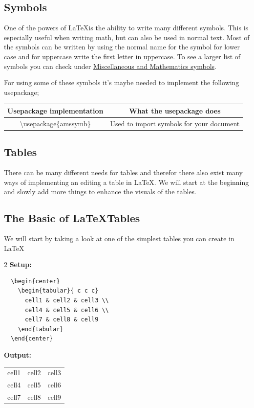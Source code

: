 \documentclass{article}
\newcommand{\bs}[1]{\textbackslash{}#1} %
\begin{document}
\subsection{Symbols}
One of the powers of \LaTeX is the ability to write many different symbols. This is especially useful when writing math, but can also be used in normal text. Most of the symbols can be written by using the normal name for the symbol for lower case and for uppercase write the first letter in uppercase. To see a larger list of symbols you can check under \hyperref[secc:Math-Symbols]{Miscellaneous and Mathematics symbols}. 

For using some of these symbols it's maybe needed to implement the following usepackage;
\begin{table}[h]
    \centering
    \begin{tabular}{|c|c|} \hline
       \rowcolor{gray!30} 
       Usepackage implementation & What the usepackage does \\ \hline
       \bs{usepackage\{amssymb\}} & Used to import symbols for your document \\ \hline 
    \end{tabular}
\end{table}
\subsection{Tables}
There can be many different needs for tables and therefor there also exist many ways of implementing an editing a table in \LaTeX. We will start at the beginning and slowly add more things to enhance the 
visuals of the tables.

\subsection*{The Basic of \LaTeX Tables}
We will start by taking a look at one of the simplest tables you can create in \LaTeX
\begin{multicols}{2}
  \textbf{Setup:}
  \begin{lstlisting}
  \begin{center}
    \begin{tabular}{ c c c}
      cell1 & cell2 & cell3 \\
      cell4 & cell5 & cell6 \\
      cell7 & cell8 & cell9
    \end{tabular}
  \end{center}
  \end{lstlisting}
  \columnbreak

  \textbf{Output:}
  \begin{center}
    \begin{tabular}{ c c c }
      cell1 & cell2 & cell3 \\
      cell4 & cell5 & cell6 \\
      cell7 & cell8 & cell9
    \end{tabular}
  \end{center}
\end{multicols}
\end{document}
